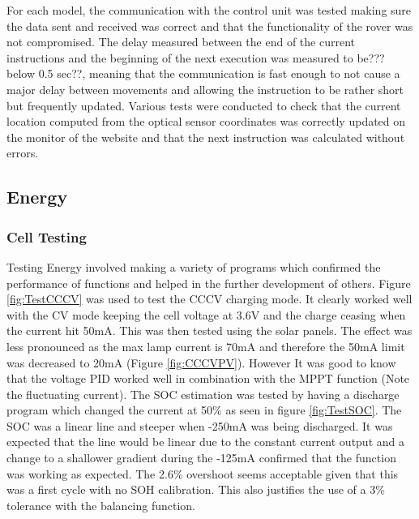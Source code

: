 \documentclass[10pt,twoside]{article}
\begin{document}
For each model, the communication with the control unit was tested making sure the data sent and received was correct and that the functionality of the rover was not compromised. The delay measured between the end of the current instructions and the beginning of the next execution was measured to be??? below 0.5 sec??, meaning that the communication is fast enough to not cause a major delay between movements and allowing the instruction to be rather short but frequently updated. Various tests were conducted to check that the current location computed from the optical sensor coordinates was correctly updated on the monitor of the website and that the next instruction was calculated without errors.
\newpage

\subsection{Energy}

\subsubsection{Cell Testing}

Testing Energy involved making a variety of programs which confirmed the performance of functions and helped in the further development of others. Figure \ref{fig:TestCCCV} was used to test the CCCV charging mode. It clearly worked well with the CV mode keeping the cell voltage at 3.6V and the charge ceasing when the current hit 50mA. This was then tested using the solar panels. The effect was less pronounced as the max lamp current is 70mA and therefore the 50mA limit was decreased to 20mA (Figure \ref{fig:CCCVPV}). However It was good to know that the voltage PID worked well in combination with the MPPT function (Note the fluctuating current). The SOC estimation was tested by having a discharge program which changed the current at 50\% as seen in figure \ref{fig:TestSOC}. The SOC was a linear line and steeper when -250mA was being discharged. It was expected that the line would be linear due to the constant current output and a change to a shallower gradient during the -125mA confirmed that the function was working as expected. The 2.6\% overshoot seems acceptable given that this was a first cycle with no SOH calibration. This also justifies the use of a 3\% tolerance with the balancing function.  
\end{document}
